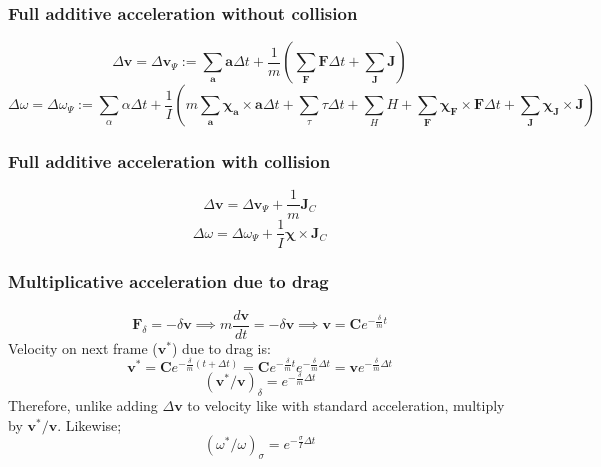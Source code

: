 \documentclass[10pt]{report}
\begin{document}
\subsubsection{Full additive acceleration without collision}
\begin{equation}\Delta\boldsymbol{v}=\Delta\boldsymbol{v}_\Psi:=\sum_{\boldsymbol{a}}\boldsymbol{a}\Delta t+\frac{1}{m}\left(\sum_{\boldsymbol{F}}\boldsymbol{F}\Delta t+\sum_{\boldsymbol{J}}\boldsymbol{J}\right)\end{equation}
\begin{equation}\Delta\omega=\Delta\omega_\Psi:=\sum_\alpha\alpha\Delta t+\frac{1}{I}\left(m\sum_{\boldsymbol{a}}\boldsymbol{\chi}_{\boldsymbol{a}}\times\boldsymbol{a}\Delta t+\sum_\tau\tau\Delta t+\sum_HH+\sum_{\boldsymbol{F}}\boldsymbol{\chi_{\boldsymbol{F}}}\times{\boldsymbol{F}}\Delta t+\sum_{\boldsymbol{J}}\boldsymbol{\chi_{\boldsymbol{J}}}\times{\boldsymbol{J}}\right)\end{equation}

\subsubsection{Full additive acceleration with collision}
\begin{equation}\Delta\boldsymbol{v}=\Delta\boldsymbol{v}_\Psi+\frac{1}{m}\boldsymbol{J}_C\end{equation}
\begin{equation}\Delta\omega=\Delta\omega_\Psi+\frac{1}{I}\boldsymbol{\chi}\times\boldsymbol{J}_C\end{equation}

\subsubsection{Multiplicative acceleration due to drag}
\begin{equation}\boldsymbol{F}_\delta=-\delta\boldsymbol{v}\implies m\frac{d\boldsymbol{v}}{dt}=-\delta\boldsymbol{v}\implies\boldsymbol{v}=\boldsymbol{C}e^{-\frac{\delta}{m}t}\end{equation}
Velocity on next frame ($\boldsymbol{v}^*$) due to drag is:
\begin{equation}\boldsymbol{v}^*=\boldsymbol{C}e^{-\frac{\delta}{m}(t+\Delta t)}=\boldsymbol{C}e^{-\frac{\delta}{m}t}e^{-\frac{\delta}{m}\Delta t}=\boldsymbol{v}e^{-\frac{\delta}{m}\Delta t}\end{equation}
\begin{equation}(\boldsymbol{v}^*/\boldsymbol{v})_\delta=e^{-\frac{\delta}{m}\Delta t}\end{equation}
Therefore, unlike adding $\Delta\boldsymbol{v}$ to velocity like with standard acceleration, multiply by $\boldsymbol{v}^*/\boldsymbol{v}$. Likewise;
\begin{equation}(\omega^*/\omega)_\sigma=e^{-\frac{\sigma}{I}\Delta t}\end{equation}
\end{document}
